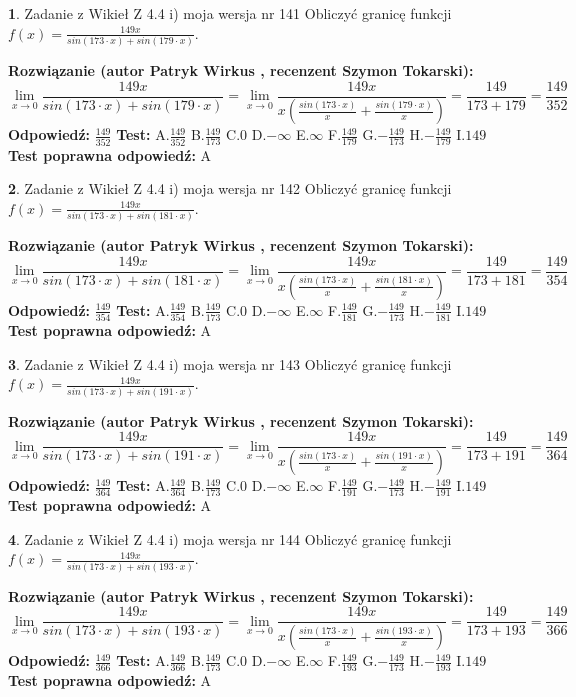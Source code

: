 \documentclass[12pt, a4paper]{article}
\theoremstyle{definition} %
\newtheorem{zad}{}
\newcommand{\zadStart}[1]{\begin{zad}#1\newline}
\newcommand{\zadStop}{\end{zad}}
\newcommand{\rozwStart}[2]{\noindent \textbf{Rozwiązanie (autor #1 , recenzent #2): }\newline}
\newcommand{\rozwStop}{\newline}
\newcommand{\odpStart}{\noindent \textbf{Odpowiedź:}\newline}
\newcommand{\odpStop}{\newline}
\newcommand{\testStart}{\noindent \textbf{Test:}\newline}
\newcommand{\testStop}{\newline}
\newcommand{\kluczStart}{\noindent \textbf{Test poprawna odpowiedź:}\newline}
\newcommand{\kluczStop}{\newline}
\begin{document}
\zadStart{Zadanie z Wikieł Z 4.4 i) moja wersja nr 141}
Obliczyć granicę funkcji $f(x)=\frac{149x}{sin(173\cdot x) +sin(179\cdot x)}$.
\zadStop
\rozwStart{Patryk Wirkus}{Szymon Tokarski}
$$\lim\limits_{x\to 0}\frac{149x}{sin(173\cdot x) +sin(179\cdot x)}=\lim\limits_{x\to 0}\frac{149x}{x(\frac{sin(173\cdot x)}{x}+\frac{sin(179\cdot x)}{x})}=\frac{149}{173+179} = \frac{149}{352}$$
\rozwStop
\odpStart
$\frac{149}{352}$
\odpStop
\testStart
A.$\frac{149}{352}$
B.$\frac{149}{173}$
C.$0$
D.$-\infty$
E.$\infty$
F.$\frac{149}{179}$
G.$-\frac{149}{173}$
H.$-\frac{149}{179}$
I.$149$
\testStop
\kluczStart
A
\kluczStop



\zadStart{Zadanie z Wikieł Z 4.4 i) moja wersja nr 142}
Obliczyć granicę funkcji $f(x)=\frac{149x}{sin(173\cdot x) +sin(181\cdot x)}$.
\zadStop
\rozwStart{Patryk Wirkus}{Szymon Tokarski}
$$\lim\limits_{x\to 0}\frac{149x}{sin(173\cdot x) +sin(181\cdot x)}=\lim\limits_{x\to 0}\frac{149x}{x(\frac{sin(173\cdot x)}{x}+\frac{sin(181\cdot x)}{x})}=\frac{149}{173+181} = \frac{149}{354}$$
\rozwStop
\odpStart
$\frac{149}{354}$
\odpStop
\testStart
A.$\frac{149}{354}$
B.$\frac{149}{173}$
C.$0$
D.$-\infty$
E.$\infty$
F.$\frac{149}{181}$
G.$-\frac{149}{173}$
H.$-\frac{149}{181}$
I.$149$
\testStop
\kluczStart
A
\kluczStop



\zadStart{Zadanie z Wikieł Z 4.4 i) moja wersja nr 143}
Obliczyć granicę funkcji $f(x)=\frac{149x}{sin(173\cdot x) +sin(191\cdot x)}$.
\zadStop
\rozwStart{Patryk Wirkus}{Szymon Tokarski}
$$\lim\limits_{x\to 0}\frac{149x}{sin(173\cdot x) +sin(191\cdot x)}=\lim\limits_{x\to 0}\frac{149x}{x(\frac{sin(173\cdot x)}{x}+\frac{sin(191\cdot x)}{x})}=\frac{149}{173+191} = \frac{149}{364}$$
\rozwStop
\odpStart
$\frac{149}{364}$
\odpStop
\testStart
A.$\frac{149}{364}$
B.$\frac{149}{173}$
C.$0$
D.$-\infty$
E.$\infty$
F.$\frac{149}{191}$
G.$-\frac{149}{173}$
H.$-\frac{149}{191}$
I.$149$
\testStop
\kluczStart
A
\kluczStop



\zadStart{Zadanie z Wikieł Z 4.4 i) moja wersja nr 144}
Obliczyć granicę funkcji $f(x)=\frac{149x}{sin(173\cdot x) +sin(193\cdot x)}$.
\zadStop
\rozwStart{Patryk Wirkus}{Szymon Tokarski}
$$\lim\limits_{x\to 0}\frac{149x}{sin(173\cdot x) +sin(193\cdot x)}=\lim\limits_{x\to 0}\frac{149x}{x(\frac{sin(173\cdot x)}{x}+\frac{sin(193\cdot x)}{x})}=\frac{149}{173+193} = \frac{149}{366}$$
\rozwStop
\odpStart
$\frac{149}{366}$
\odpStop
\testStart
A.$\frac{149}{366}$
B.$\frac{149}{173}$
C.$0$
D.$-\infty$
E.$\infty$
F.$\frac{149}{193}$
G.$-\frac{149}{173}$
H.$-\frac{149}{193}$
I.$149$
\testStop
\kluczStart
A
\kluczStop
\end{document}
